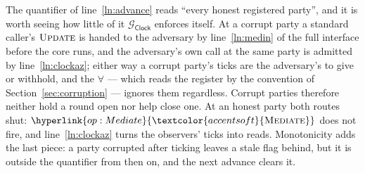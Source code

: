 \documentclass[10pt,oneside,openany]{book}
\newcommand{\op}[1]{\textnormal{\textsc{#1}}}
\newcommand{\opl}[1]{\hyperlink{op:#1}{\textcolor{accentsoft}{\op{#1}}}}
\newcommand{\Gclock}{\mathcal{G}_{\mathsf{Clock}}}
\theoremstyle{accentdef}
\theoremstyle{accentplain}
\begin{document}
The quantifier of line~\ref{ln:advance} reads ``every honest registered party'', and it is worth
seeing how little of it $\Gclock$ enforces itself. At a corrupt party a standard caller's
$\op{Update}$ is handed to the adversary by line~\ref{ln:medin} of the full interface before the
core runs, and the adversary's own call at the same party is admitted by line~\ref{ln:clockaz};
either way a corrupt party's ticks are the adversary's to give or withhold, and the $\forall$ ---
which reads the register by the convention of Section~\ref{sec:corruption} --- ignores them
regardless. Corrupt parties therefore neither hold a round open nor help close one. At an honest
party both routes shut: $\opl{Mediate}$ does not fire, and line~\ref{ln:clockaz} turns the
observers' ticks into reads. Monotonicity adds the last piece: a party corrupted after ticking
leaves a stale flag behind, but it is outside the quantifier from then on, and the next advance
clears it.
\end{document}
